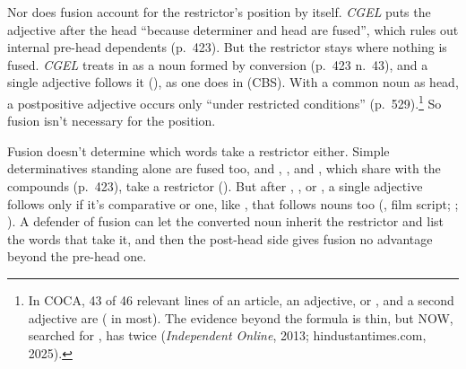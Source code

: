 Nor does fusion account for the restrictor's position by itself. \textit{CGEL} puts the adjective after the head \enquote{because determiner and head are fused}, which rules out internal pre-head dependents (p.~423). But the restrictor stays where nothing is fused. \textit{CGEL} treats  in  as a noun formed by conversion (p.~423 n.~43), and a single adjective follows it (), as one does in  (CBS). With a common noun as head, a postpositive adjective occurs only \enquote{under restricted conditions} (p.~529).\footnote{In COCA, 43 of 46 relevant lines of an article, an adjective,  or , and a second adjective are  ( in most). The evidence beyond the formula is thin, but NOW, searched for , has  twice (\textit{Independent Online}, 2013; hindustantimes.com, 2025).} So fusion isn't necessary for the position.

Fusion doesn't determine which words take a restrictor either. Simple determinatives standing alone are fused too, and , , and , which share  with the compounds (p.~423), take a restrictor (). But after , , or , a single adjective follows only if it's comparative or one, like , that follows nouns too (, film script; ; ). A defender of fusion can let the converted noun inherit the restrictor and list the words that take it, and then the post-head side gives fusion no advantage beyond the pre-head one.

